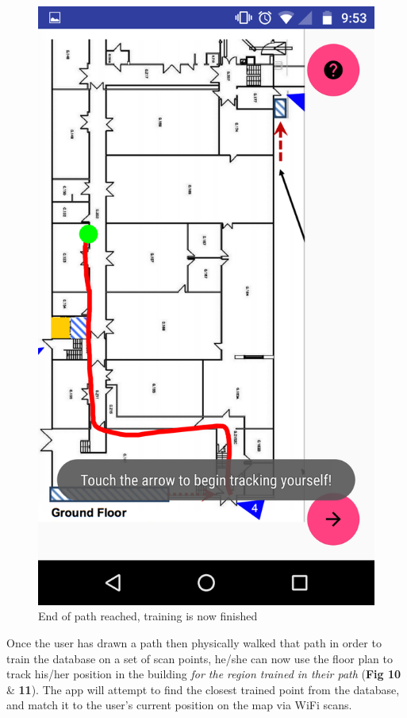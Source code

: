 \documentclass[10.8pt]{article}
\begin{document}
\begin{figure}[H]
\begin{minipage}[b]{.3\textwidth}
        \includegraphics[scale=1.2, width=\linewidth]{pic9.png}  
        \caption{End of path reached, training is now finished}  
    \end{minipage}  
\end{figure}

Once the user has drawn a path then physically walked that path in order to train the database on a set of scan points, he/she can now use the floor plan to track his/her position in the building \textit{for the region trained in their path} (\textbf{Fig 10} \& \textbf{11}). The app will attempt to find the closest trained point from the database, and match it to the user's current position on the map via WiFi scans.
\end{document}
